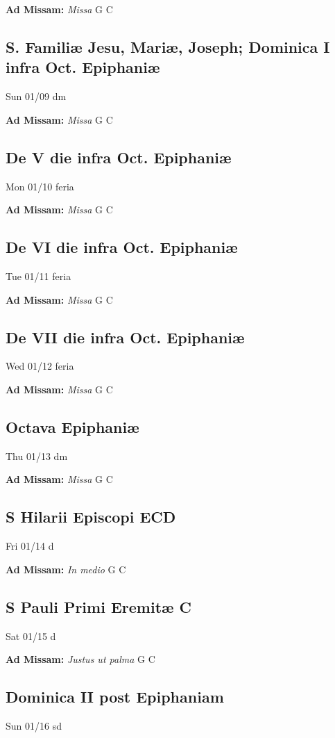 \documentclass[letterpaper, 10pt, twocolumn]{article}
\begin{document}
\textbf{Ad Missam:} \textit{Missa} G C 

\subsection*{S. Familiæ Jesu, Mariæ, Joseph; Dominica I infra Oct. Epiphaniæ}Sun 01/09 dm

\textbf{Ad Missam:} \textit{Missa} G C 

\subsection*{De V die infra Oct. Epiphaniæ}Mon 01/10 feria

\textbf{Ad Missam:} \textit{Missa} G C 

\subsection*{De VI die infra Oct. Epiphaniæ}Tue 01/11 feria

\textbf{Ad Missam:} \textit{Missa} G C 

\subsection*{De VII die infra Oct. Epiphaniæ}Wed 01/12 feria

\textbf{Ad Missam:} \textit{Missa} G C 

\subsection*{Octava Epiphaniæ}Thu 01/13 dm

\textbf{Ad Missam:} \textit{Missa} G C 

\subsection*{S Hilarii Episcopi ECD}Fri 01/14 d

\textbf{Ad Missam:} \textit{In medio} G C 

\subsection*{S Pauli Primi Eremitæ C}Sat 01/15 d

\textbf{Ad Missam:} \textit{Justus ut palma} G C 

\subsection*{Dominica II post Epiphaniam}Sun 01/16 sd
\end{document}
